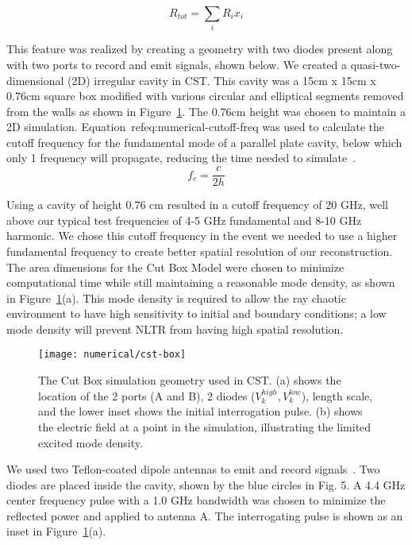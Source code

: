 \begin{equation}
R_{tot} = \sum_{i} R_{i}x_{i}
\label{eq:numerical-r-tot}
\end{equation}

This feature was realized by creating a geometry with two diodes present along with two ports to record and emit signals, shown below. We created a quasi-two-dimensional (2D) irregular cavity in CST. This cavity was a 15cm x 15cm x 0.76cm square box modified with various circular and elliptical segments removed from the walls as shown in Figure~\ref{fig:numerical-cst-box}.  The 0.76cm height was chosen to maintain a 2D simulation. Equation~ref{eq:numerical-cutoff-freq} was used to calculate the cutoff frequency for the fundamental mode of a parallel plate cavity, below which only 1 frequency will propagate, reducing the time needed to simulate~\cite{griffiths_david_introduction_1999}.
\begin{equation}
f_c = \frac{c}{2h}
\label{eq:numerical-cutoff-freq}
\end{equation}

Using a cavity of height 0.76 cm resulted in a cutoff frequency of 20 GHz, well above our typical test frequencies of 4-5 GHz fundamental and 8-10 GHz harmonic. We chose this cutoff frequency in the event we needed to use a higher fundamental frequency to create better spatial resolution of our reconstruction. The area dimensions for the Cut Box Model were chosen to minimize computational time while still maintaining a reasonable mode density, as shown in Figure~\ref{fig:numerical-cst-box}(a). This mode density is required to allow the ray chaotic environment to have high sensitivity to initial and boundary conditions; a low mode density will prevent NLTR from having high spatial resolution.

\begin{figure}[t]
\centering
\texttt{[image: numerical/cst-box]}
\caption[The Cut Box Model]{The Cut Box simulation geometry used in CST. (a) shows the location of the 2 ports (A and B), 2 diodes ($V_k^{high}, V_k^{low}$), length scale, and the lower inset shows the initial interrogation pulse. (b) shows the electric field at a point in the simulation, illustrating the limited excited mode density.}
\label{fig:numerical-cst-box}
\end{figure}

We used two Teflon-coated dipole antennas to emit and record signals~\cite{hemmady2006universal}. Two diodes are placed inside the cavity, shown by the blue circles in Fig. 5. A 4.4 GHz center frequency pulse with a 1.0 GHz bandwidth was chosen to minimize the reflected power and applied to antenna A. The interrogating pulse is shown as an inset in Figure~\ref{fig:numerical-cst-box}(a).

